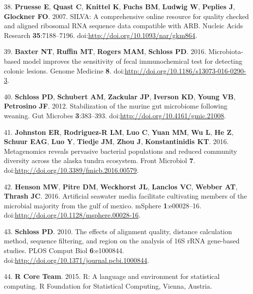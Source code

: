 \documentclass[11pt,]{article}
\begin{document}
38. \textbf{Pruesse E}, \textbf{Quast C}, \textbf{Knittel K},
\textbf{Fuchs BM}, \textbf{Ludwig W}, \textbf{Peplies J},
\textbf{Glockner FO}. 2007. SILVA: A comprehensive online resource for
quality checked and aligned ribosomal RNA sequence data compatible with
ARB. Nucleic Acids Research \textbf{35}:7188--7196.
doi:\url{http://doi.org/10.1093/nar/gkm864}.

39. \textbf{Baxter NT}, \textbf{Ruffin MT}, \textbf{Rogers MAM},
\textbf{Schloss PD}. 2016. Microbiota-based model improves the
sensitivity of fecal immunochemical test for detecting colonic lesions.
Genome Medicine \textbf{8}.
doi:\url{http://doi.org/10.1186/s13073-016-0290-3}.

40. \textbf{Schloss PD}, \textbf{Schubert AM}, \textbf{Zackular JP},
\textbf{Iverson KD}, \textbf{Young VB}, \textbf{Petrosino JF}. 2012.
Stabilization of the murine gut microbiome following weaning. Gut
Microbes \textbf{3}:383--393.
doi:\url{http://doi.org/10.4161/gmic.21008}.

41. \textbf{Johnston ER}, \textbf{Rodriguez-R LM}, \textbf{Luo C},
\textbf{Yuan MM}, \textbf{Wu L}, \textbf{He Z}, \textbf{Schuur EAG},
\textbf{Luo Y}, \textbf{Tiedje JM}, \textbf{Zhou J},
\textbf{Konstantinidis KT}. 2016. Metagenomics reveals pervasive
bacterial populations and reduced community diversity across the alaska
tundra ecosystem. Front Microbiol \textbf{7}.
doi:\url{http://doi.org/10.3389/fmicb.2016.00579}.

42. \textbf{Henson MW}, \textbf{Pitre DM}, \textbf{Weckhorst JL},
\textbf{Lanclos VC}, \textbf{Webber AT}, \textbf{Thrash JC}. 2016.
Artificial seawater media facilitate cultivating members of the
microbial majority from the gulf of mexico. mSphere
\textbf{1}:e00028--16.
doi:\url{http://doi.org/10.1128/msphere.00028-16}.

43. \textbf{Schloss PD}. 2010. The effects of alignment quality,
distance calculation method, sequence filtering, and region on the
analysis of 16S rRNA gene-based studies. PLOS Comput Biol
\textbf{6}:e1000844.
doi:\url{http://doi.org/10.1371/journal.pcbi.1000844}.

44. \textbf{R Core Team}. 2015. R: A language and environment for
statistical computing. R Foundation for Statistical Computing, Vienna,
Austria.
\end{document}

